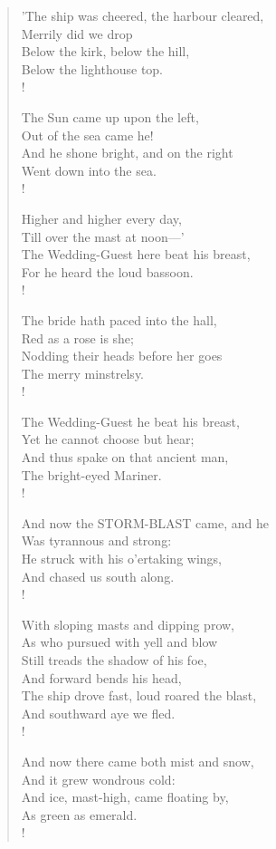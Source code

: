 \documentclass[11pt,twoside]{book}
\begin{document}
\begin{verse}
'The ship was cheered, the harbour cleared, \\
Merrily did we drop \\
Below the kirk, below the hill, \\
Below the lighthouse top. \\!

The Sun came up upon the left, \\
Out of the sea came he! \\
And he shone bright, and on the right \\
Went down into the sea. \\!

Higher and higher every day, \\
Till over the mast at noon—' \\
The Wedding-Guest here beat his breast, \\
For he heard the loud bassoon. \\!

The bride hath paced into the hall, \\
Red as a rose is she; \\
Nodding their heads before her goes \\
The merry minstrelsy. \\!

The Wedding-Guest he beat his breast, \\
Yet he cannot choose but hear; \\
And thus spake on that ancient man, \\
The bright-eyed Mariner. \\!

And now the STORM-BLAST came, and he \\
Was tyrannous and strong: \\
He struck with his o'ertaking wings, \\
And chased us south along. \\!

With sloping masts and dipping prow, \\
As who pursued with yell and blow \\
Still treads the shadow of his foe, \\
And forward bends his head, \\
The ship drove fast, loud roared the blast, \\
And southward aye we fled. \\!

And now there came both mist and snow, \\
And it grew wondrous cold: \\
And ice, mast-high, came floating by, \\
As green as emerald. \\!


\end{verse}
\end{document}
